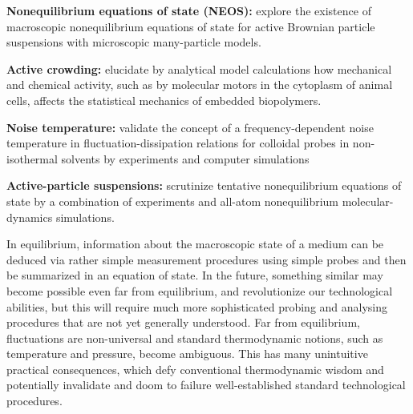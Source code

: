 \begin{workpackage}[id=WPactive,wphases=0-48,
  short=Active Particle Suspensions,%
  title=Probing active particle suspensions with colloids and polymers,
  lead=ULEI,
  ULEIRM=96,UNIPDRM=6,USTUTTRM=2]

\newrefsection

\begin{wpobjectives}
  \begin{compactitem}

  \item \textbf{Nonequilibrium equations of state (NEOS):} explore the existence of
  macroscopic nonequilibrium equations of state for active Brownian particle suspensions
  with microscopic many-particle models.
  \item \textbf{Active crowding:} elucidate by analytical model calculations how mechanical
  and chemical activity, such as by molecular motors in the cytoplasm of animal cells,
  affects the statistical mechanics of embedded biopolymers.
  \item \textbf{Noise temperature:} validate the concept of a frequency-dependent noise
  temperature in fluctuation-dissipation relations for colloidal probes 
  in non-isothermal solvents by experiments and computer simulations
  \item \textbf{Active-particle suspensions:} scrutinize tentative nonequilibrium equations
  of state by a combination of experiments and all-atom nonequilibrium molecular-dynamics
  simulations.
  \end{compactitem}
\end{wpobjectives}

\begin{wpdescription}
In equilibrium, information about the macroscopic state of a medium can be deduced via
rather simple measurement procedures using simple probes and then be summarized in an
equation of state.
%
In the future, something similar may become possible even far from equilibrium, and
revolutionize our technological abilities, but this will require much more sophisticated
probing and analysing procedures that are not yet generally understood.
%
Far from equilibrium, fluctuations are non-universal and standard thermodynamic notions,
such as temperature and pressure, become ambiguous.
%
This has many unintuitive practical consequences, which defy conventional thermodynamic
wisdom and potentially invalidate and doom to failure well-established standard
technological procedures.


\end{wpdescription}
\end{workpackage}

